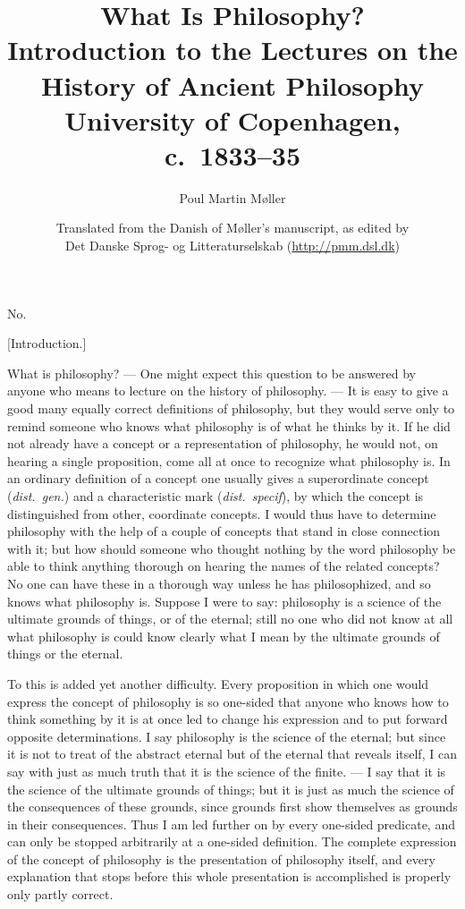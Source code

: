 \documentclass[12pt]{article}
\title{\textbf{What Is Philosophy?}\\[0.5em]
  \large Introduction to the Lectures on the History of Ancient Philosophy\\
  University of Copenhagen, c.\ 1833--35}
\author{Poul Martin Møller}
\date{Translated from the Danish of Møller's manuscript, as edited by\\
  Det Danske Sprog- og Litteraturselskab (\url{http://pmm.dsl.dk})}
\newcommand{\opage}[1]{\marginnote{\footnotesize\textit{[#1]}}}
\begin{document}
\maketitle

\begin{flushright}\opage{1r}No.\end{flushright}

\begin{center}[Introduction.]\end{center}

\noindent What is philosophy? --- One might expect this question to be answered by anyone who means to lecture on the history of philosophy. --- It is easy to give a good many equally correct definitions of philosophy, but they would serve only to remind someone who knows what philosophy is of what he thinks by it. If he did not already have a concept or a representation of philosophy, he would not, on hearing a single proposition, come all at once to recognize what philosophy is. In an ordinary definition of a concept one usually gives a superordinate concept (\textit{dist.\ gen.}) and a characteristic mark (\textit{dist.\ specif}), by which the concept is distinguished from other, coordinate concepts. I would thus have to determine philosophy with the help of a couple of concepts that stand in close connection with it; but how should someone who thought nothing by the word philosophy be able to think anything thorough on hearing the names of the related concepts? No one can have these in a thorough way unless he has philosophized, and so knows what philosophy is. Suppose I were to say: philosophy is a science of the ultimate grounds of things, or of the eternal; still no one who did not know at all what philosophy is could know clearly what I mean by the ultimate grounds of things\opage{1v} or the eternal.

To this is added yet another difficulty. Every proposition in which one would express the concept of philosophy is so one-sided that anyone who knows how to think something by it is at once led to change his expression and to put forward opposite determinations. I say philosophy is the science of the eternal; but since it is not to treat of the abstract eternal but of the eternal that reveals itself, I can say with just as much truth that it is the science of the finite. --- I say that it is the science of the ultimate grounds of things; but it is just as much the science of the consequences of these grounds, since grounds first show themselves as grounds in their consequences. Thus I am led further on by every one-sided predicate, and can only be stopped arbitrarily at a one-sided definition. The complete expression of the concept of philosophy is the presentation of philosophy itself, and every explanation that stops before this whole presentation is accomplished is properly only partly correct.
\end{document}
